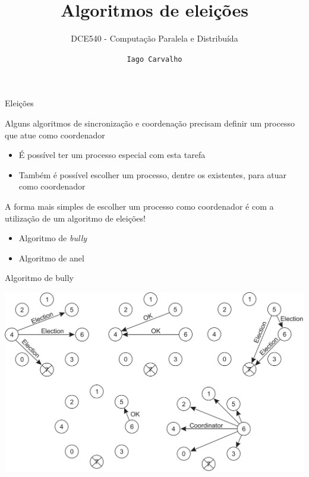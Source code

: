 \documentclass[compress]{beamer}
\title{Algoritmos de eleições}
\subtitle{DCE540 - Computação Paralela e Distribuída}
\author{\texttt{Iago Carvalho}}
\institute{\texttt{Departamento de Ciência da Computação}}
\begin{document}
\begin{frame}
\titlepage

\end{frame}


\begin{frame}{Eleições}

Alguns algoritmos de sincronização e coordenação precisam definir um processo que atue como coordenador
\begin{itemize}
    \item É possível ter um processo especial com esta tarefa
    \item Também é possível escolher um processo, dentre os existentes, para atuar como coordenador
\end{itemize}

\vspace{0.5cm}

A forma mais simples de escolher um processo como coordenador é com a utilização de um algoritmo de eleições!
\begin{itemize}
    \item Algoritmo de \textit{bully}
    \item Algoritmo de anel
\end{itemize}
\end{frame}


\begin{frame}{Algoritmo de bully}

\centering \includegraphics[width=\textwidth]{images/bully.png}
\end{frame}

\end{document}
